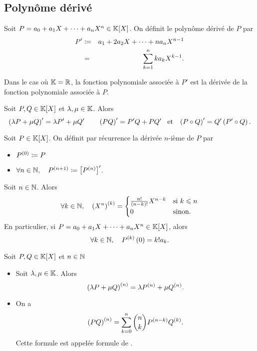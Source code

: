 \documentclass{magnolia}
\begin{document}
\subsection{Polynôme dérivé}

\begin{definition}
Soit $P=a_0+a_1 X+\cdots+a_n X^n\in\polyK$. On définit le polynôme dérivé de
$P$ par
\begin{eqnarray*}
P' &\coloneqq& a_1 + 2a_2 X+\cdots+na_nX^{n-1}\\
   &=& \sum_{k=1}^n ka_k X^{k-1}.
\end{eqnarray*}
\end{definition}

\begin{remarqueUnique}
\remarque Dans le cas où $\mathbb{K}=\mathbb{R}$, la fonction polynomiale associée à $P'$ est
  la dérivée de la fonction polynomiale associée à $P$.
\end{remarqueUnique}

\begin{proposition}
Soit $P,Q\in\polyK$ et $\lambda,\mu\in\mathbb{K}$. Alors
\[\left(\lambda P+\mu Q\right)'=\lambda P'+\mu Q' \qquad
  \left(PQ\right)'=P'Q+PQ' \quad\!\text{et}\quad\! \left(P\circ Q\right)'=Q'\left(P'\circ Q\right).\]
\end{proposition}

\begin{definition}
Soit $P\in\polyK$. On définit par récurrence la dérivée $n$-ième de $P$ par
\begin{itemize}
\item $P^{(0)}\coloneqq P$
\item $\forall n\in\mathbb{N} ,\quad P^{(n+1)}\coloneqq \left[P^{(n)}\right]'$.
\end{itemize}
\end{definition}

\begin{remarqueUnique}
\remarque Soit $n\in\mathbb{N}$. Alors
  \[\forall k\in\mathbb{N} ,\quad \left(X^n\right)^{(k)}=
    \begin{cases}
    \frac{n!}{\left(n-k\right)!}X^{n-k} &\text{si $k\leqslant n$}\\
    0 & \text{sinon.}
    \end{cases}\]
  En particulier, si $P=a_0+a_1X+\cdots+a_nX^n\in\polyK$, alors
  \[\forall k\in\mathbb{N} ,\quad P^{(k)}\left(0\right)=k! a_k.\]
\end{remarqueUnique}

\begin{proposition}
Soit $P,Q\in\polyK$ et $n\in\mathbb{N}$
\begin{itemize}
\item Soit $\lambda,\mu\in\mathbb{K}$. Alors
  \[\left(\lambda P+\mu Q\right)^{(n)}=\lambda P^{(n)}+\mu Q^{(n)}.\]
\item On a
  \[\left(PQ\right)^{(n)}=\sum_{k=0}^n \binom{n}{k}P^{(n-k)}Q^{(k)}.\]
  Cette formule est appelée formule de .
\end{itemize}
\end{proposition}
\end{document}
